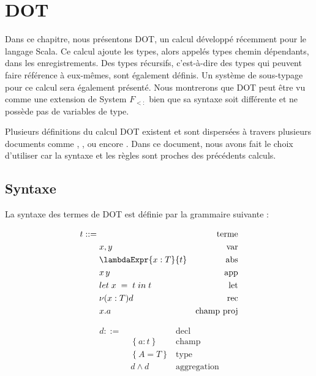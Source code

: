 \chapter{DOT}

Dans ce chapitre, nous présentons DOT, un calcul développé récemment pour le
langage Scala. Ce calcul ajoute les types, alors
appelés types chemin dépendants, dans les enregistrements. Des types
récursifs, c'est-à-dire des types qui peuvent faire référence à eux-mêmes, sont
également définis. Un système de sous-typage pour ce calcul sera
également présenté.
Nous montrerons que DOT peut être vu comme une
extension de System $F_{<:}$ bien que sa syntaxe soit différente et ne possède
pas de variables de type.

Plusieurs définitions du calcul DOT existent et sont dispersées à travers
plusieurs documents comme \cite{nada-amin-thesis}, \cite{OOPSLA-DOT-2016},
\cite{POPL-2017-DOT} ou encore \cite{WF-DOT-2016}. Dans ce document, nous avons
fait le choix d'utiliser \cite{WF-DOT-2016} car la syntaxe et les règles sont
proches des précédents calculs.

\section{Syntaxe}

La syntaxe des termes de DOT est définie par la grammaire suivante :
\begin{minipage}{0.45\textwidth}
  \begin{align*}
    t ::= & \, & \text{terme} \\
          & \; x, y & \text{var} \\
          & \; \lambdaExpr{x : T}{t} & \text{abs} \\
          & \; x \, y & \text{app} \\
          & \; \localLetBinding{x}{t}{t} & \text{let} \\
          & \; \nu(x : T)d & \text{rec} \\
          & \; x.a & \text{champ proj} \\
\end{align*}
\end{minipage}
\begin{minipage}{0.45\textwidth}
  \begin{align*}
    d ::= & \, & \text{decl} \\
          & \; \left\{ a : t \right\} & \text{champ} \\
          & \; \left\{ A = T \right\} & \text{type} \\
          & \; d \wedge d & \text{aggregation}
\end{align*}
\end{minipage}

